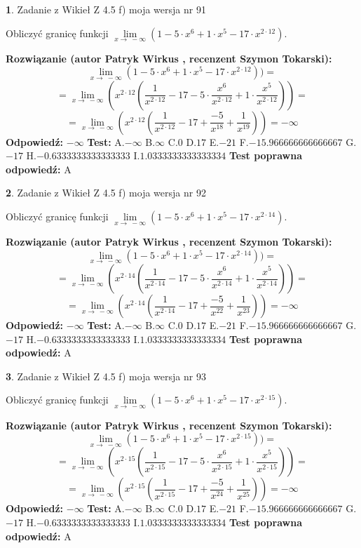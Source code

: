 \documentclass[12pt, a4paper]{article}
\theoremstyle{definition} %
\newtheorem{zad}{}
\newcommand{\zadStart}[1]{\begin{zad}#1\newline}
\newcommand{\zadStop}{\end{zad}}
\newcommand{\rozwStart}[2]{\noindent \textbf{Rozwiązanie (autor #1 , recenzent #2): }\newline}
\newcommand{\rozwStop}{\newline}
\newcommand{\odpStart}{\noindent \textbf{Odpowiedź:}\newline}
\newcommand{\odpStop}{\newline}
\newcommand{\testStart}{\noindent \textbf{Test:}\newline}
\newcommand{\testStop}{\newline}
\newcommand{\kluczStart}{\noindent \textbf{Test poprawna odpowiedź:}\newline}
\newcommand{\kluczStop}{\newline}
\begin{document}
\zadStart{Zadanie z Wikieł Z 4.5 f) moja wersja nr 91}


Obliczyć granicę funkcji  $\lim\limits_{x\to\ -\infty}(1 - 5 \cdot x^{6}+1 \cdot x^{5}- 17 \cdot x^{2\cdot12})$.
\zadStop
\rozwStart{Patryk Wirkus}{Szymon Tokarski}
$$\lim\limits_{x\to\ -\infty}(1 - 5 \cdot x^{6}+1 \cdot x^{5}- 17 \cdot x^{2\cdot12}))=$$
$$=\lim\limits_{x\to\ -\infty}(x^{2\cdot12}(\frac{1}{x^{2\cdot12}}-17 -5 \cdot \frac{x^{6}}{x^{2\cdot12}}+1 \cdot \frac{x^{5}}{x^{2\cdot12}}))=$$
$$=\lim\limits_{x\to\ -\infty}(x^{2\cdot12}(\frac{1}{x^{2\cdot12}}-17 + \frac{-5}{x^{18}}+ \frac{1}{x^{19}}))=-\infty$$
\rozwStop
\odpStart
$-\infty$
\odpStop
\testStart
A.$-\infty$ B.$\infty$ C.$0$ D.$17$ E.$-21$
F.$-15.966666666666667$ G.$-17$
H.$-0.6333333333333333$
I.$1.0333333333333334$
\testStop
\kluczStart
A
\kluczStop



\zadStart{Zadanie z Wikieł Z 4.5 f) moja wersja nr 92}


Obliczyć granicę funkcji  $\lim\limits_{x\to\ -\infty}(1 - 5 \cdot x^{6}+1 \cdot x^{5}- 17 \cdot x^{2\cdot14})$.
\zadStop
\rozwStart{Patryk Wirkus}{Szymon Tokarski}
$$\lim\limits_{x\to\ -\infty}(1 - 5 \cdot x^{6}+1 \cdot x^{5}- 17 \cdot x^{2\cdot14}))=$$
$$=\lim\limits_{x\to\ -\infty}(x^{2\cdot14}(\frac{1}{x^{2\cdot14}}-17 -5 \cdot \frac{x^{6}}{x^{2\cdot14}}+1 \cdot \frac{x^{5}}{x^{2\cdot14}}))=$$
$$=\lim\limits_{x\to\ -\infty}(x^{2\cdot14}(\frac{1}{x^{2\cdot14}}-17 + \frac{-5}{x^{22}}+ \frac{1}{x^{23}}))=-\infty$$
\rozwStop
\odpStart
$-\infty$
\odpStop
\testStart
A.$-\infty$ B.$\infty$ C.$0$ D.$17$ E.$-21$
F.$-15.966666666666667$ G.$-17$
H.$-0.6333333333333333$
I.$1.0333333333333334$
\testStop
\kluczStart
A
\kluczStop



\zadStart{Zadanie z Wikieł Z 4.5 f) moja wersja nr 93}


Obliczyć granicę funkcji  $\lim\limits_{x\to\ -\infty}(1 - 5 \cdot x^{6}+1 \cdot x^{5}- 17 \cdot x^{2\cdot15})$.
\zadStop
\rozwStart{Patryk Wirkus}{Szymon Tokarski}
$$\lim\limits_{x\to\ -\infty}(1 - 5 \cdot x^{6}+1 \cdot x^{5}- 17 \cdot x^{2\cdot15}))=$$
$$=\lim\limits_{x\to\ -\infty}(x^{2\cdot15}(\frac{1}{x^{2\cdot15}}-17 -5 \cdot \frac{x^{6}}{x^{2\cdot15}}+1 \cdot \frac{x^{5}}{x^{2\cdot15}}))=$$
$$=\lim\limits_{x\to\ -\infty}(x^{2\cdot15}(\frac{1}{x^{2\cdot15}}-17 + \frac{-5}{x^{24}}+ \frac{1}{x^{25}}))=-\infty$$
\rozwStop
\odpStart
$-\infty$
\odpStop
\testStart
A.$-\infty$ B.$\infty$ C.$0$ D.$17$ E.$-21$
F.$-15.966666666666667$ G.$-17$
H.$-0.6333333333333333$
I.$1.0333333333333334$
\testStop
\kluczStart
A
\kluczStop
\end{document}
